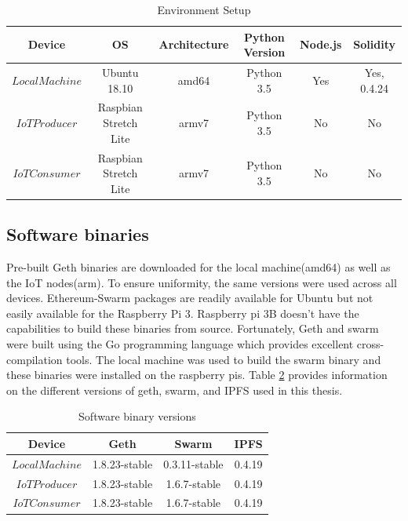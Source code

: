 \documentclass[11pt,openright]{report}
\begin{document}
\begin{table}[!htbp]
	\renewcommand{\arraystretch}{1}
	\caption{Environment Setup}
	\label{environment_setup}
	\centering
	\begin{tabular}{|c|c|c|c|c|c|}
		\hline
		\bfseries Device & \bfseries OS & \bfseries Architecture & \bfseries Python Version & \bfseries Node.js & \bfseries Solidity\\
		\hline\hline
		$Local Machine$ & Ubuntu 18.10 & amd64 & Python 3.5 &  Yes & Yes, 0.4.24\\ \hline
		$IoT Producer$ & Raspbian Stretch Lite & armv7 & Python 3.5 &  No & No\\ \hline
		$IoT Consumer$ & Raspbian Stretch Lite & armv7 & Python 3.5 &  No & No\\ \hline
	\end{tabular}
\end{table}

\subsection{Software binaries}
Pre-built Geth binaries are downloaded for the local machine(amd64) as well as the IoT nodes(arm). To ensure uniformity, the same versions were used across all devices. Ethereum-Swarm packages are readily available for Ubuntu but not easily available for the Raspberry Pi 3.
Raspberry pi 3B doesn't have the capabilities to build these binaries from source.
Fortunately, Geth and swarm were built using the Go programming language which provides excellent cross-compilation tools. The local machine was used to build the swarm binary and these binaries were installed on the raspberry pis. Table \ref{software_version} provides information on the different versions of geth, swarm, and IPFS used in this thesis.

\begin{table}[!htbp]
	\renewcommand{\arraystretch}{1}
	\caption{Software binary versions}
	\label{software_version}
	\centering
	\begin{tabular}{|c|c|c|c|}
		\hline
		\bfseries Device & \bfseries Geth & \bfseries Swarm  & \bfseries IPFS\\
		\hline\hline
		$Local Machine$ & 1.8.23-stable & 0.3.11-stable & 0.4.19 \\ \hline
		$IoT Producer$ & 1.8.23-stable & 1.6.7-stable & 0.4.19 \\ \hline
		$IoT Consumer$ & 1.8.23-stable & 1.6.7-stable & 0.4.19 \\ \hline
	\end{tabular}
\end{table}
\end{document}
